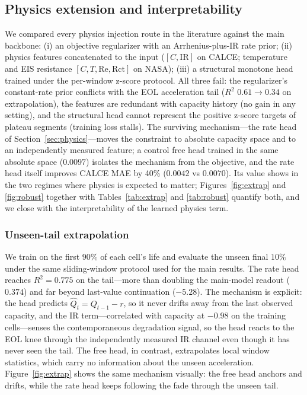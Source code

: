 \subsection{Physics extension and interpretability}
\label{sec:phys}

We compared every physics injection route in the literature against
the main backbone: (i) an objective regularizer with an
Arrhenius-plus-IR rate prior; (ii) physics features concatenated to
the input ($[C,\mathrm{IR}]$ on CALCE; temperature and EIS
resistance $[C,T,\mathrm{Re},\mathrm{Rct}]$ on NASA); (iii) a
structural monotone head trained under the per-window z-score
protocol. All three fail: the regularizer's constant-rate prior
conflicts with the EOL acceleration tail ($R^2$ $0.61\to0.34$ on
extrapolation), the features are redundant with capacity history (no
gain in any setting), and the structural head cannot represent the
positive z-score targets of plateau segments (training loss stalls).
The surviving mechanism---the rate head of
Section~\ref{sec:physics}---moves the constraint to absolute
capacity space and to an independently measured feature; a control
free head trained in the same absolute space ($0.0097$) isolates the
mechanism from the objective, and the rate head itself improves
CALCE MAE by 40\% ($0.0042$ vs $0.0070$). Its value shows in the
two regimes where physics is expected to matter;
Figures~\ref{fig:extrap} and \ref{fig:robust} together with
Tables~\ref{tab:extrap} and \ref{tab:robust} quantify both, and we
close with the interpretability of the learned physics term.

\subsubsection{Unseen-tail extrapolation}

We train on the first $90\%$ of each cell's life and evaluate the
unseen final $10\%$ under the same sliding-window protocol used for
the main results. The rate head reaches $R^2 = 0.775$ on the
tail---more than doubling the main-model readout ($0.374$) and far
beyond last-value continuation ($-5.28$). The mechanism is explicit:
the head predicts $\hat{Q}_t = Q_{t-1} - r$, so it never drifts
away from the last observed capacity, and the IR term---correlated
with capacity at $-0.98$ on the training cells---senses the
contemporaneous degradation signal, so the head reacts to the EOL
knee through the independently measured IR channel even though it
has never seen the tail. The free head, in contrast, extrapolates
local window statistics, which carry no information about the
unseen acceleration. Figure~\ref{fig:extrap} shows the same
mechanism visually: the free head anchors and drifts, while the
rate head keeps following the fade through the unseen tail.

